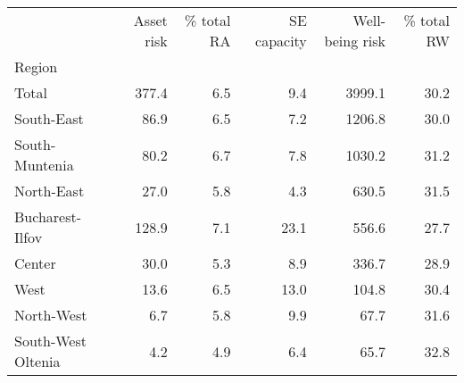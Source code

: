 \begin{tabular}{lrrrrr}
\toprule
{} &  Asset risk &  \% total RA &  SE capacity &  Well-being risk &  \% total RW \\
Region             &             &             &              &                  &             \\
\midrule
Total              &       377.4 &         6.5 &          9.4 &           3999.1 &        30.2 \\
South-East         &        86.9 &         6.5 &          7.2 &           1206.8 &        30.0 \\
South-Muntenia     &        80.2 &         6.7 &          7.8 &           1030.2 &        31.2 \\
North-East         &        27.0 &         5.8 &          4.3 &            630.5 &        31.5 \\
Bucharest-Ilfov    &       128.9 &         7.1 &         23.1 &            556.6 &        27.7 \\
Center             &        30.0 &         5.3 &          8.9 &            336.7 &        28.9 \\
West               &        13.6 &         6.5 &         13.0 &            104.8 &        30.4 \\
North-West         &         6.7 &         5.8 &          9.9 &             67.7 &        31.6 \\
South-West Oltenia &         4.2 &         4.9 &          6.4 &             65.7 &        32.8 \\
\bottomrule
\end{tabular}
